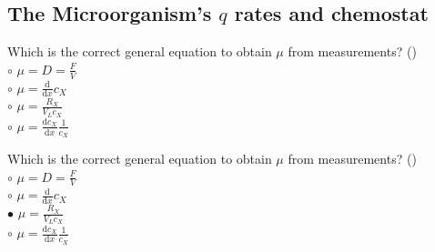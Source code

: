 \documentclass[]{beamer}
\begin{document}
\subsection{The Microorganism's $q$ rates and chemostat}
\setcounter{questions}{0}
\setcounter{answers}{0}

\begin{frame}[shrink] {}
\addtocounter{questions}{1}
\color{blue}
Which is the correct general equation to obtain $\mu$ from measurements? ()\\
\color{black}
\setlength{\parindent}{-0.4cm}
{\color{red}$\circ$} $\mu= D = \frac{F}{V}$ \\
{\color{red}$\circ$} $\mu = \frac{\mathrm d}{\mathrm d x}c_X$\\
{\color{red}$\circ$} $\mu = \frac{R_X}{V_{L}c_X}$ \\
{\color{red}$\circ$} $\mu = \frac{\mathrm dc_X}{\mathrm d x} \frac{1}{c_X}$\\
\end{frame}
\begin{frame}[shrink] {}
\addtocounter{answers}{1}
\color{blue}
Which is the correct general equation to obtain $\mu$ from measurements? ()\\
\color{black}
\setlength{\parindent}{-0.4cm}
{\color{red}$\circ$} $\mu= D = \frac{F}{V}$ \\
{\color{red}$\circ$} $\mu = \frac{\mathrm d}{\mathrm d x}c_X$\\
{\color{red}$\bullet$} $\mu = \frac{R_X}{V_{L}c_X}$ \\
{\color{red}$\circ$} $\mu = \frac{\mathrm dc_X}{\mathrm d x} \frac{1}{c_X}$\\
\end{frame}
\end{document}
